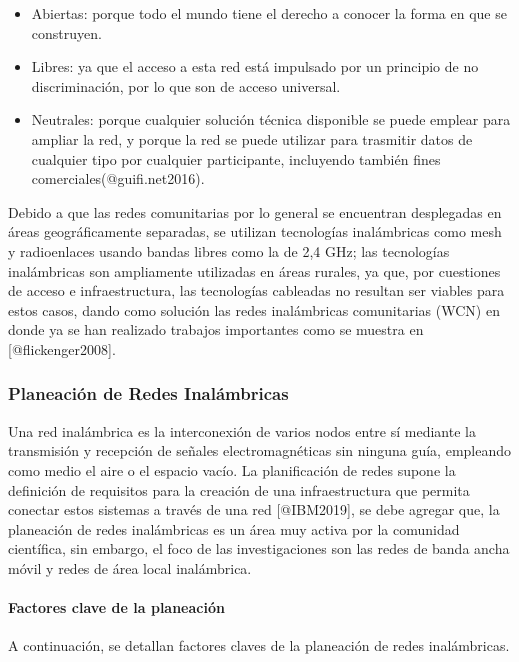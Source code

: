 \documentclass[]{article}
\let\oldparagraph\paragraph
\renewcommand{\paragraph}[1]{\oldparagraph{#1}\mbox{}}
\begin{document}
\begin{itemize}
\item
  Abiertas: porque todo el mundo tiene el derecho a conocer la forma en
  que se construyen.
\item
  Libres: ya que el acceso a esta red está impulsado por un principio de
  no discriminación, por lo que son de acceso universal.
\item
  Neutrales: porque cualquier solución técnica disponible se puede
  emplear para ampliar la red, y porque la red se puede utilizar para
  trasmitir datos de cualquier tipo por cualquier participante,
  incluyendo también fines comerciales(@guifi.net2016).
\end{itemize}

Debido a que las redes comunitarias por lo general se encuentran
desplegadas en áreas geográficamente separadas, se utilizan tecnologías
inalámbricas como mesh y radioenlaces usando bandas libres como la de
2,4 GHz; las tecnologías inalámbricas son ampliamente utilizadas en
áreas rurales, ya que, por cuestiones de acceso e infraestructura, las
tecnologías cableadas no resultan ser viables para estos casos, dando
como solución las redes inalámbricas comunitarias (WCN) en donde ya se
han realizado trabajos importantes como se muestra en
{[}@flickenger2008{]}.

\subsubsection{Planeación de Redes
Inalámbricas}\label{planeaciuxf3n-de-redes-inaluxe1mbricas}

Una red inalámbrica es la interconexión de varios nodos entre sí
mediante la transmisión y recepción de señales electromagnéticas sin
ninguna guía, empleando como medio el aire o el espacio vacío. La
planificación de redes supone la definición de requisitos para la
creación de una infraestructura que permita conectar estos sistemas a
través de una red {[}@IBM2019{]}, se debe agregar que, la planeación de
redes inalámbricas es un área muy activa por la comunidad científica,
sin embargo, el foco de las investigaciones son las redes de banda ancha
móvil y redes de área local inalámbrica.

\paragraph{Factores clave de la
planeación}\label{factores-clave-de-la-planeaciuxf3n}

A continuación, se detallan factores claves de la planeación de redes
inalámbricas.
\end{document}
